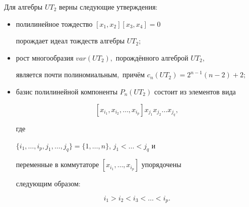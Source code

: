 \smallskip



\begin{theorem}

Для алгебры $UT_2$ верны следующие утверждения\/{\rm:}

\begin{itemize}





\item[\rm (i)] полилинейное тождество $[x_1,x_2] [x_3,x_4]=0$

порождает идеал тождеств алгебры $UT_2;$



\item[\rm (ii)] рост многообразия $var(UT_2),$ порождённого алгеброй $UT_2,$

является почти полиномиальным$,$ причём $c_n(UT_2)=2^{n-1}(n-2)+2;$



\item[\rm(iii)] базис полилинейной компоненты $P_n(UT_2)$ состоит из элементов вида

$$

 [x_{i_1},x_{i_2}, \dots ,x_{i_p}] x_{j_1} x_{j_2}  \dots  x_{j_q},

$$

 где

$\{i_1, \dots ,i_p,j_1, \dots ,j_q\}=\{1, \dots ,n\}$, $j_1< \dots <j_q$ и

переменные в коммутаторе $[x_{i_1}, \dots ,x_{i_p}]$ упорядочены

следующим образом\/{\rm :}

$$i_1> i_2<i_3< \dots <i_p.$$



\end{itemize}



\end{theorem}



\smallskip




